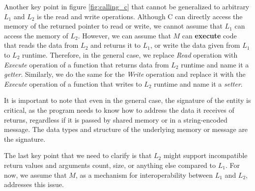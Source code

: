 \documentclass[sigplan,10pt,manuscript,nonacm]{acmart}
\begin{document}
Another key point in figure \ref{fig:calling_c} that cannot be generalized to arbitrary $L_1$ and $L_2$ is the read and write operations. Although C can directly access the memory of the returned pointer to read or write, we cannot assume that $L_1$ can access the memory of $L_2$. However, we can assume that $M$ can \textbf{execute} code that reads the data from $L_2$ and returns it to $L_1$, or write the data given from $L_1$ to $L_2$ runtime. Therefore, in the general case, we replace \textit{Read} operation with \textit{Execute} operation of a function that returns data from $L_2$ runtime and name it a \textit{getter}. Similarly, we do the same for the \textit{Write} operation and replace it with the \textit{Execute} operation of a function that writes to $L_2$ runtime and name it a \textit{setter}.

It is important to note that even in the general case, the signature of the entity is critical, as the program needs to know how to address the data it receives of returns, regardless if it is passed by shared memory or in a string-encoded message. The data types and structure of the underlying memory or message are the signature.

The last key point that we need to clarify is that $L_2$ might support incompatible return values and arguments count, size, or anything else compared to $L_1$. For now, we assume that $M$, as a mechanism for interoperability between $L_1$ and $L_2$, addresses this issue.
\end{document}
